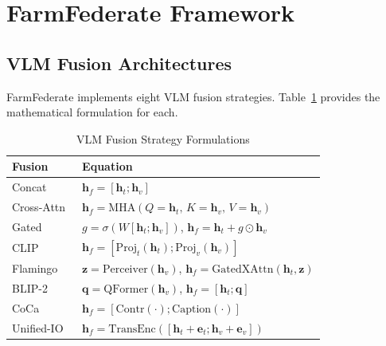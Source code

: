 \documentclass[conference]{IEEEtran}
\begin{document}
\section{FarmFederate Framework}
\label{sec:ff}

\subsection{VLM Fusion Architectures}

FarmFederate implements eight VLM fusion strategies. Table~\ref{tab:vlmfusions}
provides the mathematical formulation for each.

\begin{table}[t]
\caption{VLM Fusion Strategy Formulations}
\label{tab:vlmfusions}
\centering\footnotesize
\begin{tabular}{p{1.2cm}p{6.1cm}}
\toprule
\textbf{Fusion} & \textbf{Equation}\\
\midrule
Concat      & $\mathbf{h}_f = [\mathbf{h}_t;\mathbf{h}_v]$\\[2pt]
Cross-Attn~\cite{Vaswani2017}  & $\mathbf{h}_f = \mathrm{MHA}(Q{=}\mathbf{h}_t,\,K{=}\mathbf{h}_v,\,V{=}\mathbf{h}_v)$\\[2pt]
Gated       & $g=\sigma(W[\mathbf{h}_t;\mathbf{h}_v])$,\; $\mathbf{h}_f = \mathbf{h}_t + g\odot\mathbf{h}_v$\\[2pt]
CLIP~\cite{Radford2021}        & $\mathbf{h}_f = [\mathrm{Proj}_t(\mathbf{h}_t);\mathrm{Proj}_v(\mathbf{h}_v)]$\\[2pt]
Flamingo~\cite{Alayrac2022}    & $\mathbf{z}=\mathrm{Perceiver}(\mathbf{h}_v)$,\;
              $\mathbf{h}_f=\mathrm{GatedXAttn}(\mathbf{h}_t,\mathbf{z})$\\[2pt]
BLIP-2~\cite{Li2023}           & $\mathbf{q}=\mathrm{QFormer}(\mathbf{h}_v)$,\;
              $\mathbf{h}_f=[\mathbf{h}_t;\mathbf{q}]$\\[2pt]
CoCa~\cite{Yu2022}             & $\mathbf{h}_f = [\mathrm{Contr}(\cdot);\mathrm{Caption}(\cdot)]$\\[2pt]
Unified-IO~\cite{Lu2022}  & $\mathbf{h}_f = \mathrm{TransEnc}([\mathbf{h}_t{+}\mathbf{e}_t;\mathbf{h}_v{+}\mathbf{e}_v])$\\
\bottomrule
\end{tabular}
\end{table}
\end{document}
